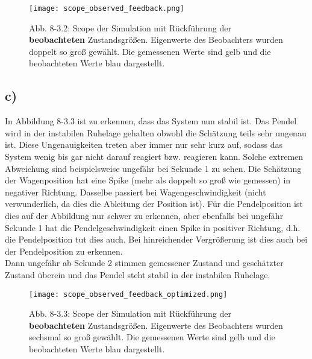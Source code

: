\documentclass[11pt]{scrartcl} %
\begin{document}
\begin{figure}[H]
\centering
\texttt{[image: scope\_observed\_feedback.png]}
\captionsetup{labelformat=empty}
\caption{Abb. 8-3.2: Scope der Simulation mit Rückführung der \textbf{beobachteten} Zustandsgrößen. Eigenwerte des Beobachters wurden doppelt so groß gewählt. Die gemessenen Werte sind gelb und die beobachteten Werte blau dargestellt.}
\end{figure}

\subsection*{c)}
In Abbildung 8-3.3 ist zu erkennen, dass das System nun stabil ist. Das Pendel wird in der instabilen Ruhelage gehalten obwohl die Schätzung teils sehr ungenau ist. Diese Ungenauigkeiten treten aber immer nur sehr kurz auf, sodass das System wenig bis gar nicht darauf reagiert bzw. reagieren kann. Solche extremen Abweichung sind beispielsweise ungefähr bei Sekunde 1 zu sehen. Die Schätzung der Wagenposition hat eine Spike (mehr als doppelt so groß wie gemessen) in negativer Richtung. Dasselbe passiert bei Wagengeschwindigkeit (nicht verwunderlich, da dies die Ableitung der Position ist). Für die Pendelposition ist dies auf der Abbildung nur schwer zu erkennen, aber ebenfalls bei ungefähr Sekunde 1 hat die Pendelgeschwindigkeit einen Spike in positiver Richtung, d.h. die Pendelposition tut dies auch. Bei hinreichender Vergrößerung ist dies auch bei der Pendelposition zu erkennen.\\
Dann ungefähr ab Sekunde 2 stimmen gemessener Zustand und geschätzter Zustand überein und das Pendel steht stabil in der instabilen Ruhelage.

\begin{figure}[H]
\centering
\texttt{[image: scope\_observed\_feedback\_optimized.png]}
\captionsetup{labelformat=empty}
\caption{Abb. 8-3.3: Scope der Simulation mit Rückführung der \textbf{beobachteten} Zustandsgrößen. Eigenwerte des Beobachters wurden sechsmal so groß gewählt. Die gemessenen Werte sind gelb und die beobachteten Werte blau dargestellt.}
\end{figure}
\end{document}
